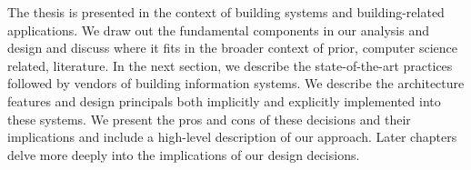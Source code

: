 The thesis is presented in the context of building systems and building-related applications.  We draw out the fundamental 
components in our analysis and design and discuss where it fits in the broader context of prior, computer science related,
literature.  In the next section, we describe the state-of-the-art practices followed by vendors of building information systems.
We describe the architecture features and design principals both implicitly and explicitly implemented into these systems.
We present the pros and cons of these decisions and their implications and include a high-level description of our approach.
Later chapters delve more deeply into the implications of our design decisions.








